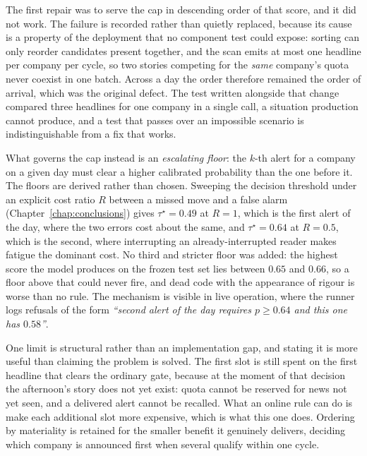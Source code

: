 The first repair was to serve the cap in descending order of that score, and it did not work. The
failure is recorded rather than quietly replaced, because its cause is a property of the deployment
that no component test could expose: sorting can only reorder candidates present together, and the
scan emits at most one headline per company per cycle, so two stories competing for the \emph{same}
company's quota never coexist in one batch. Across a day the order therefore remained the order of
arrival, which was the original defect. The test written alongside that change compared three
headlines for one company in a single call, a situation production cannot produce, and a test that
passes over an impossible scenario is indistinguishable from a fix that works.

What governs the cap instead is an \emph{escalating floor}: the $k$-th alert for a company on a
given day must clear a higher calibrated probability than the one before it. The floors are derived
rather than chosen. Sweeping the decision threshold under an explicit cost ratio $R$ between a
missed move and a false alarm (Chapter~\ref{chap:conclusions}) gives $\tau^\star = 0.49$ at $R=1$,
which is the first alert of the day, where the two errors cost about the same, and
$\tau^\star = 0.64$ at $R = 0.5$, which is the second, where interrupting an already-interrupted
reader makes fatigue the dominant cost. No third and stricter floor was added: the highest score the
model produces on the frozen test set lies between $0.65$ and $0.66$, so a floor above that could
never fire, and dead code with the appearance of rigour is worse than no rule. The mechanism is
visible in live operation, where the runner logs refusals of the form \emph{``second alert of the
day requires $p \ge 0.64$ and this one has $0.58$''}.

One limit is structural rather than an implementation gap, and stating it is more useful than
claiming the problem is solved. The first slot is still spent on the first headline that clears the
ordinary gate, because at the moment of that decision the afternoon's story does not yet exist:
quota cannot be reserved for news not yet seen, and a delivered alert cannot be recalled. What an
online rule can do is make each additional slot more expensive, which is what this one does.
Ordering by materiality is retained for the smaller benefit it genuinely delivers, deciding which
company is announced first when several qualify within one cycle.

